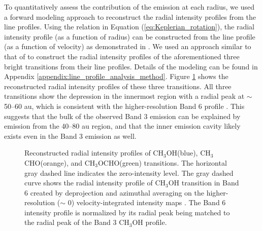 \documentclass[linenumbers, twocolumn, twocolappendix, astrosymb, times]{aastex631}
\newcommand{\methanol}{CH$_3$OH\xspace}
\newcommand{\acetaldehyde}{CH$_3$CHO\xspace}
\newcommand{\methylformate}{CH$_3$OCHO\xspace}
\begin{document}
To quantitatively assess the contribution of the emission at each radius, we used a forward modeling approach to reconstruct the radial intensity profiles from the line profiles. Using the relation in Equation (\ref{eq:Keplerian_rotation}), the radial intensity profile (as a function of radius) can be constructed from the line profile (as a function of velocity) as demonstrated in \citet{Bosman2021}. We used an approach similar to that of \citet{Bosman2021} to construct the radial intensity profiles of the aforementioned three bright transitions from their line profiles. Details of the modeling can be found in Appendix \ref{appendix:line_profile_analysis_method}. Figure \ref{fig:radial_profile_from_line_profile} shows the reconstructed radial intensity profiles of these three transitions. All three transitions show the depression in the innermost region with a radial peak at $\sim$ 50--60 au, which is consistent with the higher-resolution Band 6 profile \citep{Tobin2023}. This suggests that the bulk of the observed Band 3 emission can be explained by emission from the 40--80 au region, and that the inner emission cavity likely exists even in the Band 3 emission as well. 

\begin{figure}
\caption{Reconstructed radial intensity profiles of \methanol (blue), \acetaldehyde (orange), and \methylformate (green) transitions. The horizontal gray dashed line indicates the zero-intensity level. The gray dashed curve shows the radial intensity profile of \methanol transition in Band 6 created by deprojection and azimuthal averaging on the higher-resolution ($\sim$ 0) velocity-integrated intensity maps \citep{Tobin2023}. The Band 6 intensity profile is normalized by its radial peak being matched to the radial peak of the Band 3 \methanol profile.}
\label{fig:radial_profile_from_line_profile}
\end{figure}
\end{document}
